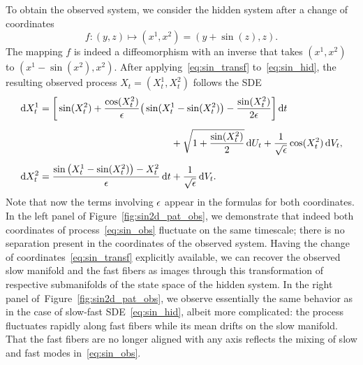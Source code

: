 \documentclass{article}
\begin{document}
To obtain the observed system, we consider the hidden system after a change of coordinates
\begin{equation}\label{eq:sin_transf}
f\colon(y, z)\mapsto (x^1,x^2)=(y+\sin(z), z).
\end{equation}
The mapping $f$ is indeed a diffeomorphism with an inverse that takes $(x^1,x^2)$ to $(x^1-\sin(x^2), x^2)$. After applying~\eqref{eq:sin_transf} to~\eqref{eq:sin_hid}, the resulting observed process $X_t=(X^1_t,X^2_t)$ follows the SDE
\begin{gather}\label{eq:sin_obs}
    \begin{aligned}
        \der{X^1_t} &= \bigg[\sin(X^2_t)+\frac{\cos(X^2_t)}{\ep}\big(\sin(X^1_t-\sin(X^2_t)\big)-\frac{\sin(X^2_t)}{2\ep}\bigg]\der{t}\\[.5em]
        &\hspace{13.5em}+ \sqrt{1+\frac{\sin(X^2_t)}{2}}\der{U_t} + \frac{1}{\sqrt{\ep}}\cos(X^2_t)\der{V}_t,\\[.5em]
        \der{X^2_t} &= \frac{\sin\big(X^1_t-\sin(X^2_t)\big) - X^2_t}{\ep}\der{t} + \frac{1}{\sqrt{\ep}}\der{V_t}.
    \end{aligned}
\end{gather}
Note that now the terms involving $\epsilon$ appear in the formulas for both coordinates. In the left panel of Figure~\ref{fig:sin2d_pat_obs}, we demonstrate that indeed both coordinates of process~\eqref{eq:sin_obs} fluctuate on the same timescale; there is no separation present in the coordinates of the observed system. Having the change of coordinates~\eqref{eq:sin_transf} explicitly available, we can recover the observed slow manifold and the fast fibers as images through this transformation of respective submanifolds of the state space of the hidden system. In the right panel of~Figure~\ref{fig:sin2d_pat_obs}, we observe essentially the same behavior as in the case of slow-fast SDE~\eqref{eq:sin_hid}, albeit more complicated: the process fluctuates rapidly along fast fibers while its mean drifts on the slow manifold. That the fast fibers are no longer aligned with any axis reflects the mixing of slow and fast modes in~\eqref{eq:sin_obs}.
\end{document}
